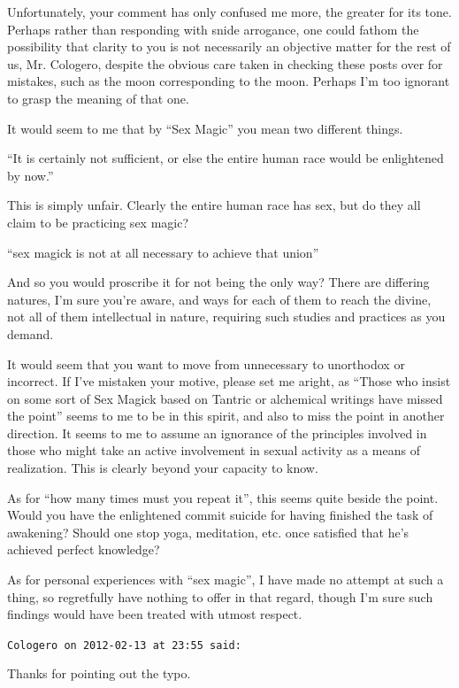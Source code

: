 \begin{footnotesize}
\begin{sffamily}
Unfortunately, your comment has only confused me more, the greater for its tone. Perhaps rather than responding with snide arrogance, one could fathom the possibility that clarity to you is not necessarily an objective matter for the rest of us, Mr. Cologero, despite the obvious care taken in checking these posts over for mistakes, such as the moon corresponding to the moon. Perhaps I'm too ignorant to grasp the meaning of that one.

It would seem to me that by ``Sex Magic'' you mean two different things.

``It is certainly not sufficient, or else the entire human race would be enlightened by now.''

This is simply unfair. Clearly the entire human race has sex, but do they all claim to be practicing sex magic?

``sex magick is not at all necessary to achieve that union''

And so you would proscribe it for not being the only way? There are differing natures, I'm sure you're aware, and ways for each of them to reach the divine, not all of them intellectual in nature, requiring such studies and practices as you demand.

It would seem that you want to move from unnecessary to unorthodox or incorrect. If I've mistaken your motive, please set me aright, as ``Those who insist on some sort of Sex Magick based on Tantric or alchemical writings have missed the point'' seems to me to be in this spirit, and also to miss the point in another direction. It seems to me to assume an ignorance of the principles involved in those who might take an active involvement in sexual activity as a means of realization. This is clearly beyond your capacity to know.

As for ``how many times must you repeat it'', this seems quite beside the point. Would you have the enlightened commit suicide for having finished the task of awakening? Should one stop yoga, meditation, etc. once satisfied that he's achieved perfect knowledge?

As for personal experiences with ``sex magic'', I have made no attempt at such a thing, so regretfully have nothing to offer in that regard, though I'm sure such findings would have been treated with utmost respect.

\hfill

\texttt{Cologero on 2012-02-13 at 23:55 said:}

Thanks for pointing out the typo.


\end{sffamily}
\end{footnotesize}
